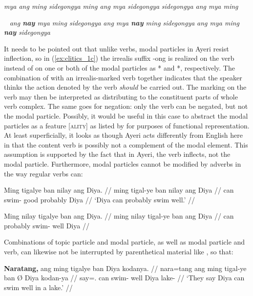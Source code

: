 \pex\label{ex:clitics_3}
\a \ljudge{*} \textit{mya ang ming sidegongya}
\a \ljudge{*} \textit{ming ang mya sidegongya}
\a \ljudge{*} \textit{sidegongya ang mya ming}
\xe

\pex~\label{ex:clitics_4}
\a \ljudge{*} \textit{ang \textbf{nay} mya ming sidegongya}
\a \ljudge{*} \textit{ang mya \textbf{nay} ming sidegongya}
\a \ljudge{*} \textit{ang mya ming \textbf{nay} sidegongya}
\xe

It needs to be pointed out that unlike verbs, modal particles in Ayeri resist
inflection, so in (\ref{ex:clitics_1c}) the irrealis suffix  {-ong}
is realized on the verb  instead
of on one or both of the modal particles as * and
*, respectively. The combination of  with an irrealis-marked verb together indicates that the speaker
thinks the action denoted by the verb \emph{should} be carried out. The marking
on the verb may then  be interpreted as distributing to the constituent parts
of whole verb complex. The same goes for negation: only the verb can be
negated, but not the modal particle. Possibly, it would be useful in this case
to abstract the modal particles as a feature [\Mod{}\textsc{ality}] as listed
by \citet[Feature Table]{pargram} for purposes of functional representation. At
least superficially, it looks as though Ayeri acts differently from English
here in that the content verb is possibly not a complement of the modal
element. This assumption is supported by the fact that in Ayeri, the verb
inflects, not the modal particle. Furthermore, modal particles cannot be
modified by adverbs in the way regular verbs can:

\pex\label{ex:clitics_5}
\a\label{ex:clitics_5a}\begingl
	\gla Ming tigalye ban nilay ang Diya. //
	\glb ming tigal-ye ban nilay ang Diya //
	\glc can swim-\TsgF{} good probably \Aarg{} Diya //
	\glft `Diya can probably swim well.' //
\endgl

\a\label{ex:clitics_5b}\ljudge{*}\begingl
	\gla Ming nilay tigalye ban ang Diya. //
	\glb ming nilay tigal-ye ban ang Diya //
	\glc can probably swim-\TsgF{} well \Aarg{} Diya //
\endgl
\xe

Combinations of topic particle and modal particle, as well as modal particle
and verb, can likewise not be interrupted by parenthetical material like
, so that:

\pex\label{ex:clitics_6}
\a\label{ex:clitics_6a}\begingl
	\gla \textbf{Naratang,} ang ming tigalye ban {} Diya kodanya. //
	\glb nara=tang ang ming tigal-ye ban Ø Diya kodan-ya //
	\glc say=\TplM{}.\Aarg{} \AgtT{} can swim-\TsgF{} well \Top{} Diya 
		lake-\Loc{}	//
	\glft `They say Diya can swim well in a lake.' //
\endgl


